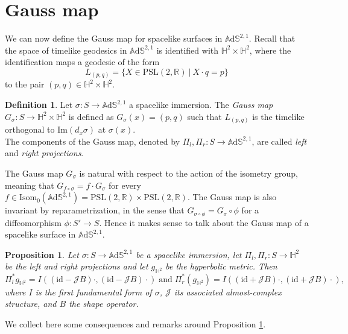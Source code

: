 \documentclass[10pt,a4paper,oneside,reqno]{book}
\def\R{\mathbb{R}}
\def\H{\mathbb{H}}
\def\A{\mathbb{A}\mathrm{d}\mathbb{S}}
\def\PSL{\text{PSL}(2,\R)}
\theoremstyle{plain}
\theoremstyle{definition}
\newtheorem{definition}[theorem]{Definition} %
\theoremstyle{plain}
\newtheorem{proposition}[theorem]{Proposition}
\theoremstyle{plain}
\theoremstyle{mystyleNormalFont}
\begin{document}
\section{Gauss map}
We can now define the Gauss map for spacelike surfaces in $\A^{2,1}$. Recall that the space of timelike geodesics in $\A^{2,1}$ is identified with $\H^2\times\H^2$, where the identification maps a geodesic of the form
\[
    L_{(p,q)}=\{ X \in\PSL \ | \ X \cdot q = p \}
\]
to the pair $(p,q) \in \H^2\times\H^2$. 
\begin{definition}
    Let $\sigma :S \to\A^{2,1}$ a spacelike immersion. The \textit{Gauss map} $G_\sigma : S \to \H^2 \times \H^2$ is defined as $G_\sigma(x) = (p,q)$ such that $L_{(p,q)}$ is the timelike orthogonal to $\text{Im}(d_x\sigma)$ at $\sigma(x)$.\\
    The components of the Gauss map, denoted by $\Pi_l, \Pi_r : S \to \A^{2,1}$, are called \textit{left} and \textit{right projections}. 
\end{definition}
The Gauss map $G_\sigma$ is natural with respect to the action of the isometry group, meaning that $G_{f\circ\sigma} = f \cdot G_\sigma$ for every $f \in\text{Isom}_0(\A^{2,1}) = \PSL\times\PSL$. The Gauss map is also invariant by reparametrization, in the sense that $G_{\sigma \circ \phi} = G_\sigma \circ \phi$ for a diffeomorphism $\phi:S'\to S$. Hence it makes sense to talk about the Gauss map of a spacelike surface in $\A^{2,1}$.
\begin{proposition}\label{prop:left right pull-back metric}
    Let $\sigma:S\to\A^{2,1}$ be a spacelike immersion, let $\Pi_l,\Pi_r:S\to\H^2$ be the left and right projections and let $g_{\H^2}$ be the hyperbolic metric. Then 
    \begin{equation}
        \Pi_l^*g_{\H^2}=I((\text{id}-\mathcal{J}B)\cdot,(\text{id}-\mathcal{J}B)\cdot)\;\text{and}\;\Pi_r^*(g_{\H^2})=I((\text{id}+\mathcal{J}B)\cdot,(\text{id}+\mathcal{J}B)\cdot),
    \end{equation}
    where $I$ is the first fundamental form of $\sigma$, $\mathcal{J}$ its associated almost-complex structure, and $B$ the shape operator.
\end{proposition}
We collect here some consequences and remarks around Proposition \ref{prop:left right pull-back metric}.
\end{document}
